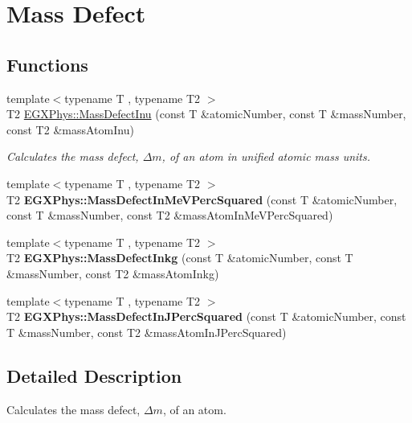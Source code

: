 \hypertarget{group___mass_defect}{}\section{Mass Defect}
\label{group___mass_defect}
\subsection*{Functions}
\begin{DoxyCompactItemize}
\item 
{\footnotesize template$<$typename T , typename T2 $>$ }\\T2 \hyperlink{group___mass_defect_ga70400004a5cb622de372ab84670731ef}{E\+G\+X\+Phys\+::\+Mass\+Defect\+Inu} (const T \&atomic\+Number, const T \&mass\+Number, const T2 \&mass\+Atom\+Inu)
\begin{DoxyCompactList}\small\item\em Calculates the mass defect, $\Delta m$, of an atom in unified atomic mass units. \end{DoxyCompactList}\item 
\mbox{\label{group___mass_defect_gab51169bf871d0ea0ee0642fa300228fe}} 
{\footnotesize template$<$typename T , typename T2 $>$ }\\T2 {\bfseries E\+G\+X\+Phys\+::\+Mass\+Defect\+In\+Me\+V\+Perc\+Squared} (const T \&atomic\+Number, const T \&mass\+Number, const T2 \&mass\+Atom\+In\+Me\+V\+Perc\+Squared)
\item 
\mbox{\label{group___mass_defect_gad5378933021e13598a76bd8581b1e887}} 
{\footnotesize template$<$typename T , typename T2 $>$ }\\T2 {\bfseries E\+G\+X\+Phys\+::\+Mass\+Defect\+Inkg} (const T \&atomic\+Number, const T \&mass\+Number, const T2 \&mass\+Atom\+Inkg)
\item 
\mbox{\label{group___mass_defect_ga08cff1dfa3259af8f1b67ec741796e91}} 
{\footnotesize template$<$typename T , typename T2 $>$ }\\T2 {\bfseries E\+G\+X\+Phys\+::\+Mass\+Defect\+In\+J\+Perc\+Squared} (const T \&atomic\+Number, const T \&mass\+Number, const T2 \&mass\+Atom\+In\+J\+Perc\+Squared)
\end{DoxyCompactItemize}


\subsection{Detailed Description}
Calculates the mass defect, $\Delta m$, of an atom. 

